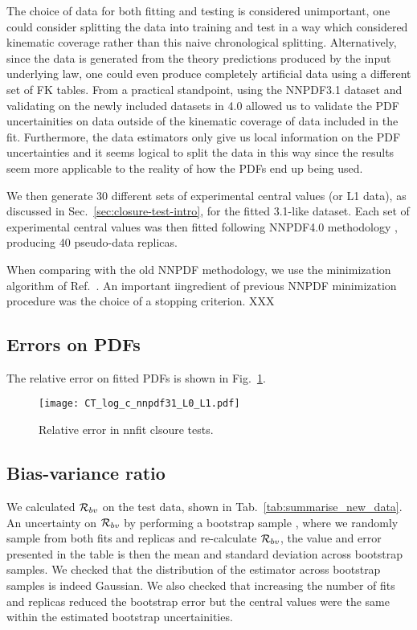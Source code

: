 The choice of data for both fitting and testing is considered unimportant, one
could consider splitting the data into training and test in a way which
considered kinematic coverage rather than this naive chronological splitting.
Alternatively, since the data is generated from the theory predictions produced
by the input underlying law, one could even produce completely artificial data
using a different set of FK tables. From a practical standpoint, using the
NNPDF3.1 dataset and validating on the newly included datasets in 4.0 allowed us
to validate the PDF uncertainities on data outside of the kinematic coverage of
data included in the fit. Furthermore, the data estimators only give us local
information on the PDF uncertainties and it seems logical to split the data in
this way since the results seem more applicable to the reality of how the PDFs
end up being used.

We then generate 30 different sets of experimental central values (or L1 data),
as discussed in Sec.~\ref{sec:closure-test-intro}, for the fitted 3.1-like
dataset. Each set of experimental central values was then fitted following
NNPDF4.0 methodology \cite{NNPDF40}, producing 40 pseudo-data replicas.

When comparing with the old NNPDF methodology, we use the minimization algorithm
of Ref.~\cite{nnpdf30}. An important iingredient of previous NNPDF minimization
procedure was the choice of a stopping criterion. XXX

\subsection{Errors on PDFs}

The relative error on fitted PDFs is shown in Fig.~\ref{fig:nnpdfLfits}.

\begin{figure}[ht]
    \centering
    \texttt{[image: CT\_log\_c\_nnpdf31\_L0\_L1.pdf]}
    \caption{Relative error in nnfit clsoure tests.}
    \label{fig:nnpdfLfits}    
\end{figure}

\subsection{Bias-variance ratio}

We calculated $\mathcal{R}_{bv}$ on the test data, shown in
Tab.~\ref{tab:summarise_new_data}. An
uncertainty on $\mathcal{R}_{bv}$ by performing a bootstrap sample
\cite{efron1994introduction},
where we randomly sample from both fits and replicas and re-calculate
$\mathcal{R}_{bv}$, the value and error presented in the table is then the mean
and standard deviation across bootstrap samples. We checked that the distribution
of the estimator across bootstrap samples is indeed Gaussian. We also checked
that increasing the number of fits and replicas reduced the bootstrap error but
the central values were the same within the estimated bootstrap uncertainities.

